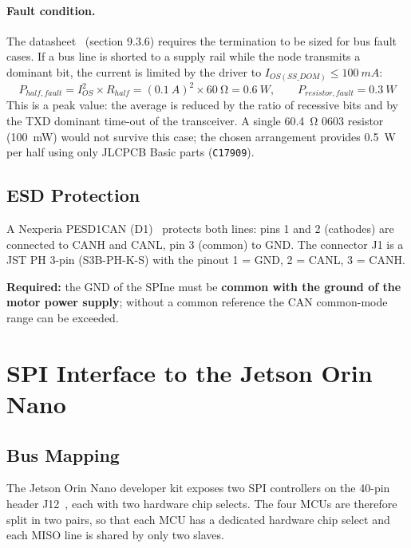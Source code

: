 \documentclass[11pt,a4paper]{article}
\newcommand{\required}[1]{\begin{reqbox}\textbf{\color{reqred}Required:} #1\end{reqbox}}
\begin{document}
\paragraph{Fault condition.} The datasheet~\cite{tcan} (section 9.3.6) requires the termination to be sized for bus
fault cases. If a bus line is shorted to a supply rail while the node transmits a dominant bit, the
current is limited by the driver to $I_{OS(SS\_DOM)} \leq \qty{100}{mA}$:
\begin{equation}
P_{half,fault} = I_{OS}^2 \times R_{half} = (\qty{0.1}{A})^2 \times \qty{60}{\ohm} = \qty{0.6}{W}, \qquad
P_{resistor,fault} = \qty{0.3}{W}
\end{equation}
This is a peak value: the average is reduced by the ratio of recessive bits and by the TXD
dominant time-out of the transceiver. A single \qty{60.4}{\ohm} 0603 resistor (\qty{100}{mW}) would not survive
this case; the chosen arrangement provides \qty{0.5}{W} per half using only JLCPCB Basic parts
(\texttt{C17909}).

\subsection{ESD Protection}\label{sec:esd}

A Nexperia PESD1CAN (D1)~\cite{pesd} protects both lines: pins 1 and 2 (cathodes) are connected to
CANH and CANL, pin 3 (common) to GND. The connector J1 is a JST PH 3-pin (S3B-PH-K-S)
with the pinout 1 = GND, 2 = CANL, 3 = CANH.

\required{the GND of the SPIne must be \textbf{common with the ground of the motor
power supply}; without a common reference the CAN common-mode range can be exceeded.}

\section{SPI Interface to the Jetson Orin Nano}

\subsection{Bus Mapping}

The Jetson Orin Nano developer kit exposes two SPI controllers on the 40-pin header J12~\cite{jetson, jetsonhacks},
each with two hardware chip selects. The four MCUs are therefore split in two pairs, so that
each MCU has a dedicated hardware chip select and each MISO line is shared by only two slaves.
\end{document}
